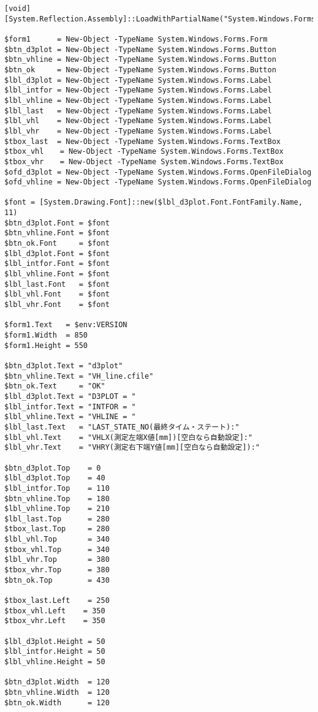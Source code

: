 \documentclass[dvipdfmx]{jsarticle}
\begin{document}
\begin{verbatim}
[void][System.Reflection.Assembly]::LoadWithPartialName("System.Windows.Forms")

$form1      = New-Object -TypeName System.Windows.Forms.Form
$btn_d3plot = New-Object -TypeName System.Windows.Forms.Button
$btn_vhline = New-Object -TypeName System.Windows.Forms.Button
$btn_ok     = New-Object -TypeName System.Windows.Forms.Button
$lbl_d3plot = New-Object -TypeName System.Windows.Forms.Label
$lbl_intfor = New-Object -TypeName System.Windows.Forms.Label
$lbl_vhline = New-Object -TypeName System.Windows.Forms.Label
$lbl_last   = New-Object -TypeName System.Windows.Forms.Label
$lbl_vhl    = New-Object -TypeName System.Windows.Forms.Label
$lbl_vhr    = New-Object -TypeName System.Windows.Forms.Label
$tbox_last  = New-Object -TypeName System.Windows.Forms.TextBox
$tbox_vhl  　= New-Object -TypeName System.Windows.Forms.TextBox
$tbox_vhr  　= New-Object -TypeName System.Windows.Forms.TextBox
$ofd_d3plot = New-Object -TypeName System.Windows.Forms.OpenFileDialog
$ofd_vhline = New-Object -TypeName System.Windows.Forms.OpenFileDialog

$font = [System.Drawing.Font]::new($lbl_d3plot.Font.FontFamily.Name, 11)
$btn_d3plot.Font = $font
$btn_vhline.Font = $font
$btn_ok.Font     = $font
$lbl_d3plot.Font = $font
$lbl_intfor.Font = $font
$lbl_vhline.Font = $font
$lbl_last.Font   = $font
$lbl_vhl.Font    = $font
$lbl_vhr.Font    = $font

$form1.Text   = $env:VERSION
$form1.Width  = 850
$form1.Height = 550

$btn_d3plot.Text = "d3plot"
$btn_vhline.Text = "VH_line.cfile"
$btn_ok.Text     = "OK"
$lbl_d3plot.Text = "D3PLOT = "
$lbl_intfor.Text = "INTFOR = "
$lbl_vhline.Text = "VHLINE = "
$lbl_last.Text   = "LAST_STATE_NO(最終タイム・ステート):"
$lbl_vhl.Text    = "VHLX(測定左端X値[mm])[空白なら自動設定]:"
$lbl_vhr.Text    = "VHRY(測定右下端Y値[mm][空白なら自動設定]):"

$btn_d3plot.Top    = 0
$lbl_d3plot.Top    = 40
$lbl_intfor.Top    = 110
$btn_vhline.Top    = 180
$lbl_vhline.Top    = 210
$lbl_last.Top      = 280
$tbox_last.Top     = 280
$lbl_vhl.Top       = 340
$tbox_vhl.Top      = 340
$lbl_vhr.Top       = 380
$tbox_vhr.Top      = 380
$btn_ok.Top        = 430

$tbox_last.Left    = 250
$tbox_vhl.Left    = 350
$tbox_vhr.Left    = 350

$lbl_d3plot.Height = 50
$lbl_intfor.Height = 50
$lbl_vhline.Height = 50

$btn_d3plot.Width  = 120
$btn_vhline.Width  = 120
$btn_ok.Width      = 120


\end{verbatim}
\end{document}
